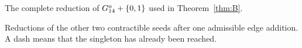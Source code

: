 \begin{table}[htbp]
\centering\small
\caption{The complete reduction of $\Ga+\{0,1\}$ used in
Theorem~\ref{thm:B}.}\label{tab:Ga-reduction}

\end{table}

\begin{table}[htbp]
\centering\small
\caption{Reductions of the other two contractible seeds after one
admissible edge addition. A dash means that the singleton has already
been reached.}\label{tab:variant-reductions}

\end{table}
